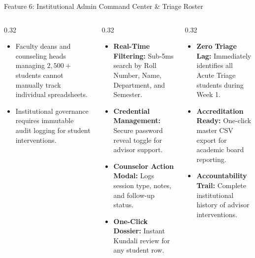 \documentclass[aspectratio=169,10pt]{beamer}
\newcommand{\whybox}[2]{
  \begin{tcolorbox}[colframe=whyframe,colbacktitle=whyframe,colback=whybg,title=\textbf{WHY? The Problem \& Need (#1)}]
  \scriptsize #2
  \end{tcolorbox}
}
\newcommand{\howbox}[2]{
  \begin{tcolorbox}[colframe=howframe,colbacktitle=howframe,colback=howbg,title=\textbf{HOW? The Technology \& Algorithms (#1)}]
  \scriptsize #2
  \end{tcolorbox}
}
\newcommand{\outbox}[2]{
  \begin{tcolorbox}[colframe=outframe,colbacktitle=outframe,colback=outbg,title=\textbf{OUTCOMES? Measurable Impact \& Results (#1)}]
  \scriptsize #2
  \end{tcolorbox}
}
\begin{document}
\begin{frame}{Feature 6: Institutional Admin Command Center \& Triage Roster}
\begin{columns}[T]
\begin{column}{0.32\textwidth}
\whybox{Institutional Scale}{
\begin{itemize}
    \item Faculty deans and counseling heads managing $2,500+$ students cannot manually track individual spreadsheets.
    \item Institutional governance requires immutable audit logging for student interventions.
\end{itemize}
}
\end{column}

\begin{column}{0.32\textwidth}
\howbox{In-Memory Triage Hub}{
\begin{itemize}
    \item \textbf{Real-Time Filtering:} Sub-5ms search by Roll Number, Name, Department, and Semester.
    \item \textbf{Credential Management:} Secure password reveal toggle for advisor support.
    \item \textbf{Counselor Action Modal:} Logs session type, notes, and follow-up status.
    \item \textbf{One-Click Dossier:} Instant Kundali review for any student row.
\end{itemize}
}
\end{column}

\begin{column}{0.32\textwidth}
\outbox{Institutional Governance}{
\begin{itemize}
    \item \textbf{Zero Triage Lag:} Immediately identifies all Acute Triage students during Week 1.
    \item \textbf{Accreditation Ready:} One-click master CSV export for academic board reporting.
    \item \textbf{Accountability Trail:} Complete institutional history of advisor interventions.
\end{itemize}
}
\end{column}
\end{columns}
\end{frame}
\end{document}
